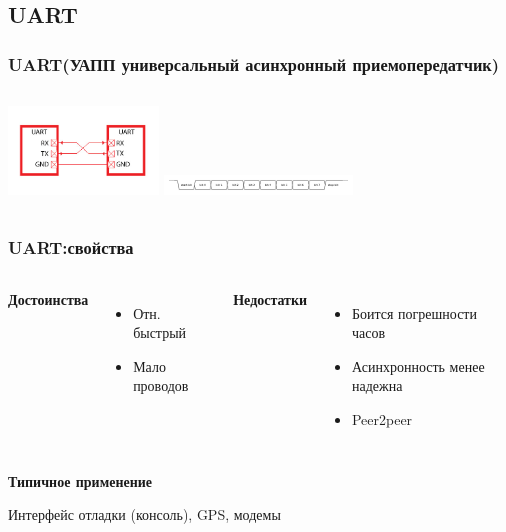 \subsection{UART}
\begin{frame}
  \frametitle{UART(УАПП универсальный асинхронный приемопередатчик)}
  \begin{columns}
    \column{4cm}
    \includegraphics[width=4cm]{./slides/hardware_protocols/uart_bus.jpg}
    \column{4.5cm}
    \includegraphics[width=5cm]{./slides/hardware_protocols/UART_timing_diagram.png}
  \end{columns}
\end{frame}

\begin{frame}
  \frametitle{UART:свойства}
  \begin{columns}
    \column{4cm}
    \begin{center}
      {\bf\large Достоинства}
    \end{center}
    \begin{itemize}
       \item Отн. быстрый
       \item Мало проводов
    \end{itemize}
    \column{4cm}
    \begin{center}
      {\bf\large Недостатки}
    \end{center}
    \begin{itemize}
       \item Боится погрешности часов 
       \item Асинхронность менее надежна
       \item Peer2peer
    \end{itemize}
  \end{columns}
  \begin{center}
    {\bf\large Типичное применение}
  \end{center}
  Интерфейс отладки (консоль), GPS, модемы
\end{frame}
